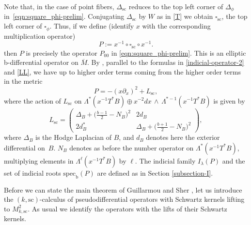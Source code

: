 \documentclass[11pt]{article}
\numberwithin{equation}{section}
\theoremstyle{plain}
\theoremstyle{definition}
\newcommand{\bb}{{\mathrm{b}}}
\newcommand{\ssc}{{\mathrm{sc}}}
\newcommand{\specb}{\mathrm{spec}_\bb}
\newcommand{\Mbar}{{\overline{M}}}\let\M\Mbar
\begin{document}
Note that, in the case of point fibers, $\Delta_{\ssc}$ reduces to the top left corner of $\Delta_{\phi}$ in~\eqref{eqn:square_phi-prelim}. Conjugating $\Delta_{\ssc}$ by $W$ as in \eqref{T} we obtain $\square_{\ssc}$, the top left corner of $\square_\phi$.
Thus, if we define (identify $x$ with the corresponding multiplication operator)
\begin{equation}\label{P-square-relation}
P:= x^{-1} \circ \square_{\ssc} \circ x^{-1}.
\end{equation}
then $P$ is precisely the operator $P_{00}$ in \eqref{eqn:square_phi-prelim}.
This is an elliptic b-differential operator on $\Mbar$. By \cite[(15)]{guillarmou2014low}, parallel to the formulas in
\eqref{indicial-operator-2} and \eqref{LL}, we have up to higher order terms coming from the
higher order terms in the metric
\begin{equation}\label{P00-sc}
P = -(x\partial_x)^{2} + L_{\ssc},
\end{equation}
where the action of $L_{\ssc}$ on $\Lambda^* (x^{-1} T^*B)
\oplus x^{-2} dx \,\wedge \,\Lambda^{*-1} (x^{-1} T^*B)$ is given by
\begin{equation}\label{P00-tangential-sc}
L_{\ssc} = \left(\begin{array}{cc}
\Delta_B + \bigl(\frac{b-1}2-N_B\bigr)^{2} &2d_B \\
2d_B^* & \Delta_B + \bigl(\frac{b+1}2-N_B\bigr)^{2}
\end{array} \right),
\end{equation}
where $\Delta_B$ is the Hodge Laplacian of $B$, and $d_B$ denotes here the exterior
differential on~$B$. $N_B$ denotes as before the number operator on $\Lambda^*(x^{-1} T^*B)$,
multiplying elements in $\Lambda^\ell(x^{-1} T^*B)$ by $\ell$. The indicial family $I_\lambda(P)$
and the set of indicial roots $\specb(P)$ are defined as in Section \ref{subsection-I}.

Before we can state the main theorem of Guillarmou and Sher \cite{guillarmou2014low},
let us introduce the $(k,\ssc)$-calculus of pseudodifferential operators with Schwartz kernels
lifting to $M^{2}_{k, \ssc}$. As usual we identify the operators with the lifts of their Schwartz kernels.
\end{document}
